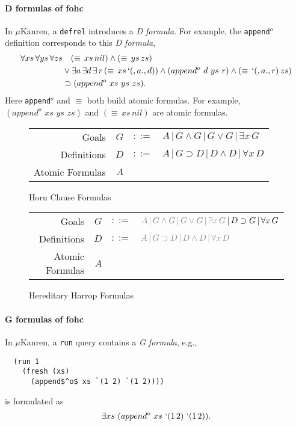 \documentclass[acmlarge,review]{acmart}
\theoremstyle{definition}
\begin{document}
\paragraph{D formulas of fohc}
In $\mu$Kanren, a \texttt{defrel} introduces a \emph{D formula}.
For example, the \texttt{append$^o$} definition corresponds to this \emph{D formula},
\begin{align*}
  \forall xs\,\forall ys\,\forall zs  & \quad (\equiv\, xs\, nil) \wedge (\equiv\, ys\, zs) \\
  & \vee \exists a\,\exists d\,\exists\,r\,(\equiv\, xs\, `(,a . ,d)) \wedge (append^o\,\, d\,\, ys\,\, r) \wedge (\equiv\, `(,a . ,r)\, zs) \\
  & \supset (append^o\,\,xs\,\, ys\,\, zs).
\end{align*}
Here \texttt{append$^o$} and $\equiv$ both build atomic formulas. For example,
$(append^o\,\,xs\,\, ys\,\, zs)$ and $(\equiv\, xs\, nil)$ are atomic formulas.


\begin{figure}[!tbp]
  \begin{tabular}{r r l l}
    Goals & $G$ & $::=$ & $A\,|\,G\wedge G\,|\,G\vee G\,|\,\exists x\,G$ \hspace{3cm} \\
    Definitions & $D$ & $::=$ & $A\,|\,G \supset D\,|\,D\wedge D\,|\,\forall x\,D $\\
    Atomic Formulas & $A$ & & \\
  \end{tabular}
  \caption{Horn Clause Formulas}\label{hc}
\end{figure}

\begin{figure}[!tbp]
  \begin{tabular}{r r l l}
    Goals & $G$ & $::=$ & ${\color{gray} A\,|\,G\wedge G\,|\,G\vee G\,|\,\exists x\,G\,}|\,D\supset G\,|\,\forall x\,G$\\
    Definitions & $D$ & $::=$ & ${\color{gray} A\,|\,G \supset D\,|\,D\wedge D\,|\,\forall x\,D }$ \hspace{3cm} \\
    Atomic Formulas & $A$ & & \\
  \end{tabular}
  \caption{Hereditary Harrop Formulas}\label{hh}
\end{figure}

\paragraph{G formulas of fohc}
In $\mu$Kanren, a \texttt{run} query contains a \emph{G formula}, e.g.,
\begin{lstlisting}
  (run 1
    (fresh (xs)
      (append$^o$ xs `(1 2) `(1 2))))
\end{lstlisting}
is formulated as
\begin{align*}
  \exists xs \,\, (append^o\,\, xs\,\, `(1\, 2)\,\, `(1\, 2)).
\end{align*}
\end{document}
